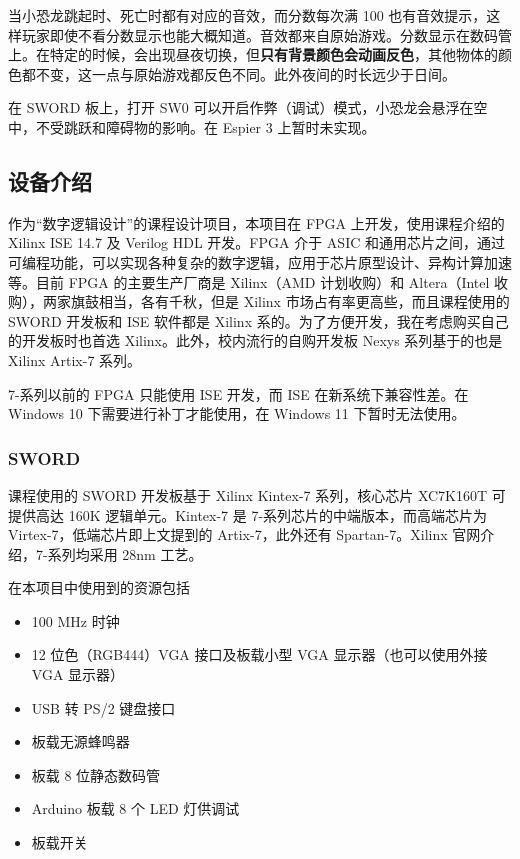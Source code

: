 \documentclass[hyperref,UTF8,12pt,a4paper]{ctexart}
\providecommand{\tightlist}{%
  \setlength{\itemsep}{0pt}\setlength{\parskip}{0pt}}
\begin{document}
当小恐龙跳起时、死亡时都有对应的音效，而分数每次满 100
也有音效提示，这样玩家即使不看分数显示也能大概知道。音效都来自原始游戏。分数显示在数码管上。在特定的时候，会出现昼夜切换，但\textbf{只有背景颜色会动画反色}，其他物体的颜色都不变，这一点与原始游戏都反色不同。此外夜间的时长远少于日间。

在 SWORD 板上，打开 SW0
可以开启作弊（调试）模式，小恐龙会悬浮在空中，不受跳跃和障碍物的影响。在
Espier 3 上暂时未实现。

\hypertarget{ux8bbeux5907ux4ecbux7ecd}{%
\subsection{设备介绍}\label{ux8bbeux5907ux4ecbux7ecd}}

作为``数字逻辑设计''的课程设计项目，本项目在 FPGA 上开发，使用课程介绍的
Xilinx ISE 14.7 及 Verilog HDL 开发。FPGA 介于 ASIC
和通用芯片之间，通过可编程功能，可以实现各种复杂的数字逻辑，应用于芯片原型设计、异构计算加速等。目前
FPGA 的主要生产厂商是 Xilinx（AMD 计划收购）和 Altera（Intel
收购），两家旗鼓相当，各有千秋，但是 Xilinx
市场占有率更高些，而且课程使用的 SWORD 开发板和 ISE 软件都是 Xilinx
系的。为了方便开发，我在考虑购买自己的开发板时也首选
Xilinx。此外，校内流行的自购开发板 Nexys 系列基于的也是 Xilinx Artix-7
系列。

7-系列以前的 FPGA 只能使用 ISE 开发，而 ISE 在新系统下兼容性差。在
Windows 10 下需要进行补丁才能使用，在 Windows 11 下暂时无法使用。

\hypertarget{sword}{%
\subsubsection{SWORD}\label{sword}}

课程使用的 SWORD 开发板基于 Xilinx Kintex-7 系列，核心芯片 XC7K160T
可提供高达 160K 逻辑单元。Kintex-7 是 7-系列芯片的中端版本，而高端芯片为
Virtex-7，低端芯片即上文提到的 Artix-7，此外还有 Spartan-7。Xilinx
官网介绍，7-系列均采用 28nm 工艺。

在本项目中使用到的资源包括

\begin{itemize}
\tightlist
\item
  100 MHz 时钟
\item
  12 位色（RGB444）VGA 接口及板载小型 VGA 显示器（也可以使用外接 VGA
  显示器）
\item
  USB 转 PS/2 键盘接口
\item
  板载无源蜂鸣器
\item
  板载 8 位静态数码管
\item
  Arduino 板载 8 个 LED 灯供调试
\item
  板载开关
\end{itemize}
\end{document}
